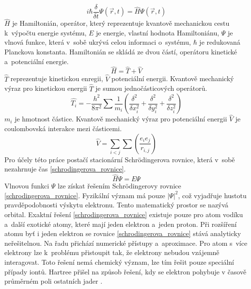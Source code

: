 \documentclass[
  printed, %
  table,   %
  lof,     %
  lot,     %
  oneside,
]{fithesis3}
\begin{document}
\begin{equation}
i \hbar \frac{\delta}{\delta t} \Psi (\vec{r},t)=\widehat{H} \Psi(\vec{r},t)
\label{SCH_time_dependent}
\end{equation}
$\widehat{H}$ je Hamiltonián, operátor, který reprezentuje kvantově mechanickou cestu k~výpočtu energie systému, $E$ je energie, vlastní hodnota Hamiltoniánu, $\Psi$ je vlnová funkce, která v~sobě ukrývá celou informaci o~systému, $\hbar$ je redukovaná Planckova konstanta. Hamiltonián se skládá ze dvou částí, operátoru kinetické a~potenciální energie.
\begin{equation}
\widehat{H} = \widehat{T} + \widehat{V}
\end{equation}
$\widehat{T}$ reprezentuje kinetickou enregii, $\widehat{V}$ potenciální energii. Kvantově mechanický výraz pro kinetickou energii $\widehat{T}$ je sumou jednočásticových operátorů. 
\begin{equation}
\widehat{T_i} = - \frac{h^2}{8 \pi ^2} \sum \frac{1}{m_i} \left( \frac{\delta^2}{\delta x_i^2} +\frac{\delta^2}{\delta y_i^2} +\frac{\delta^2}{\delta z_i^2} \right)
\end{equation}
$m_i$ je hmotnost částice. Kvantově mechanický výraz pro potenciální energii $\widehat{V}$ je coulombovská interakce mezi částicemi.
\begin{equation}
\widehat{V} = \sum_{i<j}\sum \left( \frac{e_i e_j}{r_{i,j}}\right)
\end{equation}
 Pro účely této práce postačí stacionární Schrödingerova rovnice, která v~sobě nezahrnuje čas \ref{schrodingerova_rovnice}.\\
 \begin{equation}
\widehat{H}\Psi = E \Psi
\label{schrodingerova_rovnice}
\end{equation}
Vlnovou funkci $\Psi$ lze získat řešením Schrödingerovy rovnice \ref{schrodingerova_rovnice}. Fyzikální význam má pouze $|\Psi|^2$, což vyjadřuje hustotu pravděpodobnosti výskytu elektronu. Tento matematický prostor se nazývá orbital. Exaktní řešení \ref{schrodingerova_rovnice} existuje pouze pro atom vodíku a~další exotické atomy, které mají jeden elektron a~jeden proton. Při rozšíření atomu byť i jeden elektron se rovnice \ref{schrodingerova_rovnice} stává analyticky neřešitelnou. Na řadu přichází numerické přístupy a~aproximace. Pro atom s~více elektrony lze k~problému přistoupit tak, že elektrony nebudou vzájemně interagovat. Toto řešení nemá chemický význam, lze tím řešit pouze speciální případy iontů. Hartree přišel na způsob řešení, kdy se elektron pohybuje v časově průměrném poli ostatních jader \cite{warren1986ab}.
\end{document}
